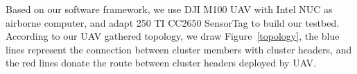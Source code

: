 Based on our software framework, we use DJI M100 UAV with Intel NUC as airborne
computer, and adapt 250 TI CC2650 SensorTag to build our testbed. According to
our UAV gathered topology, we draw Figure~\ref{topology}, the blue lines
represent the connection between cluster members with cluster headers, and the
red lines donate the route between cluster headers deployed by UAV.
